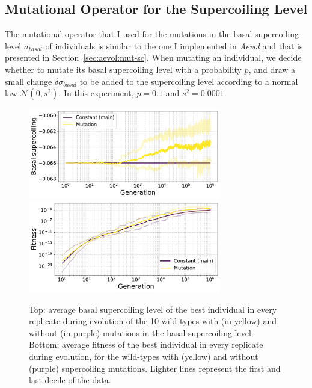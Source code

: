 \subsection{Mutational Operator for the Supercoiling Level}

The mutational operator that I used for the mutations in the basal supercoiling level $\sigma_{basal}$ of individuals is similar to the one I implemented in \emph{Aevol} and that is presented in Section~\ref{sec:aevol:mut-sc}.
When mutating an individual, we decide whether to mutate its basal supercoiling level with a probability $p$, and draw a small change $\delta\sigma_{basal}$ to be added to the supercoiling level according to a normal law $\mathcal{N}(0, s^2)$.
In this experiment, $p=0.1$ and $s^2=0.0001$.

\begin{figure}
\centering
\includegraphics[width=0.75\textwidth]{epistasis/img/basal_sc_all.pdf}
\includegraphics[width=0.75\textwidth]{epistasis/img/fitness_all_with_main.pdf}
\caption[Average basal supercoiling and fitness during evolution of the wild-types, with basal supercoiling level mutations]{Top: average basal supercoiling level of the best individual in every replicate during evolution of the 10 wild-types with (in yellow) and without (in purple) mutations in the basal supercoiling level.
Bottom: average fitness of the best individual in every replicate during evolution, for the wild-types with (yellow) and without (purple) supercoiling mutations.
Lighter lines represent the first and last decile of the data.}
\label{fig:epistasis:wt-evolution}
\end{figure}

